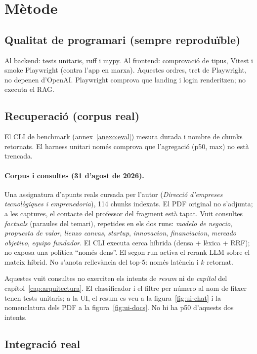 \section{Mètode}

\subsection{Qualitat de programari (sempre reproduïble)}

Al backend: tests unitaris, ruff i mypy. Al frontend: comprovació de tipus, Vitest i smoke Playwright (contra l'app en marxa).
Aquestes ordres, tret de Playwright, no depenen d'OpenAI. Playwright comprova que landing i login renderitzen; no executa el RAG.

\subsection{Recuperació (corpus real)}

El CLI de benchmark (annex~\ref{anexo:eval}) mesura durada i nombre de chunks retornats. El harness unitari només comprova que l'agregació (p50, max) no està trencada.

\paragraph{Corpus i consultes (31 d'agost de 2026).}
Una assignatura d'apunts reals cursada per l'autor (\emph{Direcció d'empreses tecnològiques i emprenedoria}), 114 chunks indexats. El PDF original no s'adjunta; a les captures, el contacte del professor del fragment està tapat. Vuit consultes \emph{factuals} (paraules del temari), repetides en els dos runs: \emph{modelo de negocio}, \emph{propuesta de valor}, \emph{lienzo canvas}, \emph{startup}, \emph{innovacion}, \emph{financiacion}, \emph{mercado objetivo}, \emph{equipo fundador}. El CLI executa cerca híbrida (densa + lèxica + RRF); no exposa una política ``només dens''. El segon run activa el rerank LLM sobre el mateix híbrid. No s'anota rellevància del top-5: només latència i $k$ retornat.

Aquestes vuit consultes no exerciten els intents de \emph{resum} ni de \emph{capítol} del capítol~\ref{cap:arquitectura}. El classificador i el filtre per número al nom de fitxer tenen tests unitaris; a la UI, el resum es veu a la figura~\ref{fig:ui-chat} i la nomenclatura dels PDF a la figura~\ref{fig:ui-docs}. No hi ha p50 d'aquests dos intents.

\subsection{Integració real}

